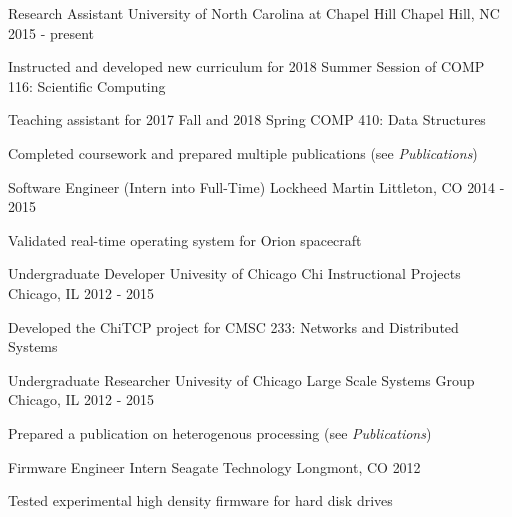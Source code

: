 
\begin{cventries}
  \cventry
    {Research Assistant} %
    {University of North Carolina at Chapel Hill} %
    {Chapel Hill, NC} %
    {2015 - present} %
    {
      \begin{cvitems} %
        \item {Instructed and developed new curriculum for 2018 Summer Session of COMP 116:  Scientific Computing}
        \item {Teaching assistant for 2017 Fall and 2018 Spring COMP 410: Data Structures}
        \item {Completed coursework and prepared multiple publications (see \textit{Publications})}
      \end{cvitems}
    }

  \cventry
    {Software Engineer (Intern into Full-Time)} %
    {Lockheed Martin} %
    {Littleton, CO} %
    {2014 - 2015} %
    {
      \begin{cvitems} %
        \item {Validated real-time operating system for Orion spacecraft}
      \end{cvitems}
    }

  \cventry
    {Undergraduate Developer} %
    {Univesity of Chicago Chi Instructional Projects} %
    {Chicago, IL} %
    {2012 - 2015} %
    {
      \begin{cvitems} %
        \item {Developed the ChiTCP project for CMSC 233: Networks and Distributed Systems}
      \end{cvitems}
    }

  \cventry
    {Undergraduate Researcher} %
    {Univesity of Chicago Large Scale Systems Group} %
    {Chicago, IL} %
    {2012 - 2015} %
    {
      \begin{cvitems} %
        \item {Prepared a publication on heterogenous processing (see \textit{Publications})}
      \end{cvitems}
    }

  \cventry
    {Firmware Engineer Intern} %
    {Seagate Technology} %
    {Longmont, CO} %
    {2012} %
    {
      \begin{cvitems} %
        \item {Tested experimental high density firmware for hard disk drives}
      \end{cvitems}
    }


\end{cventries}
